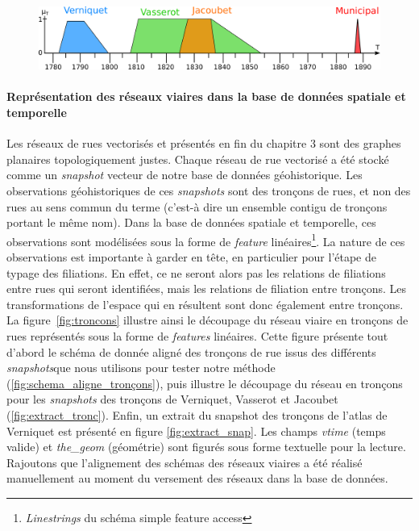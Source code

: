 \documentclass[a4paper,12pt]{article}
\begin{document}
\begin{figure}
\includegraphics[width=1\textwidth]{./images/ftime_all_rappel.png}
\end{figure}

\paragraph{Représentation des réseaux viaires dans la base de données spatiale et temporelle}
Les réseaux de rues vectorisés et présentés en fin du chapitre 3 sont des graphes planaires topologiquement justes. Chaque réseau de rue vectorisé a été stocké comme un \emph{snapshot} vecteur de notre base de données géohistorique. Les observations géohistoriques de ces \emph{snapshots} sont des tronçons de rues, et non des rues au sens commun du terme (c'est-à dire un ensemble contigu de tronçons portant le même nom). Dans la base de données spatiale et temporelle, ces observations sont modélisées sous la forme de \emph{feature} linéaires\footnote{\emph{Linestrings} du schéma simple feature access}. La nature de ces observations est importante à garder en tête, en particulier pour l'étape de typage des filiations. En effet, ce ne seront alors pas les relations de filiations entre rues qui seront identifiées, mais les relations de filiation entre tronçons. Les transformations de l'espace qui en résultent sont donc également entre tronçons. La figure~\ref{fig:troncons} illustre ainsi le découpage du réseau viaire en tronçons de rues représentés sous la forme de \emph{features} linéaires. Cette figure présente tout d'abord le schéma de donnée aligné des tronçons de rue issus des différents \emph{snapshots}que nous utilisons pour tester notre méthode (\ref{fig:schema_aligne_tronçons}), puis illustre le découpage du réseau en tronçons pour les \emph{snapshots} des tronçons de Verniquet, Vasserot et Jacoubet (\ref{fig:extract_tronc}). Enfin, un extrait du snapshot des tronçons de l'atlas de Verniquet est présenté en figure \ref{fig:extract_snap}. Les champs \emph{vtime} (temps valide) et \emph{the\_geom} (géométrie) sont figurés sous forme textuelle pour la lecture. Rajoutons que l'alignement des schémas des réseaux viaires a été réalisé manuellement au moment du versement des réseaux dans la base de données.
\end{document}
